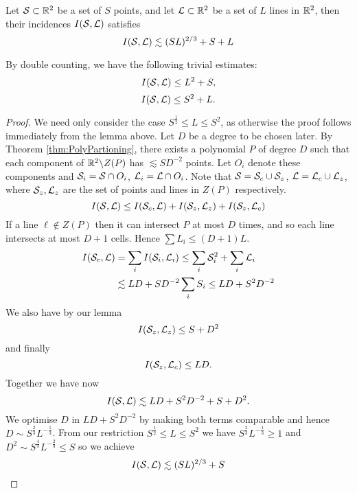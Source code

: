\begin{theorem} 
    Let $\mathcal S \subset \mathbb R^2$ be a set of $S$ points, and let $\mathcal L \subset \mathbb R^2$ be a set of $L$ lines in $\mathbb R^2$, then their incidences $I(\mathcal S,\mathcal L)$ satisfies
    $$
    I(\mathcal S, \mathcal L) \lesssim (SL)^{2/3} + S + L
    $$ 
\end{theorem}
\begin{lemma} 
    By double counting, we have the following trivial estimates:
    $$
    I(\mathcal S, \mathcal L) \leq L^2 + S,
    $$
    $$
    I(\mathcal S, \mathcal L) \leq S^2 + L.
    $$
    
    
\end{lemma}
\begin{proof}
We need only consider the case $S^{\frac{1}{2}} \leq L \leq S^2$, as otherwise the proof follows immediately from the lemma above. Let $D$ be a degree to be chosen later. By Theorem \ref{thm:PolyPartioning}, there
exists a polynomial $P$ of degree $D$ such that each component of $\mathbb R^2 \backslash Z(P)$ has $\lesssim SD^{-2}$ points. Let $O_i$ denote these components and $\mathcal S_i = \mathcal S \cap O_i$, $\mathcal L_i = \mathcal L \cap O_i$. 
Note that $\mathcal S = \mathcal S_c \cup \mathcal S_z$, $\mathcal L = \mathcal L_c \cup \mathcal L_z$, where $\mathcal S_z, \mathcal L_z$ are the set of points and lines in $Z(P)$ respectively.
$$I(\mathcal S, \mathcal L) \leq I(\mathcal S_c, \mathcal L) + I(\mathcal S_z, \mathcal L_z) + I(\mathcal S_z, \mathcal L_c)$$
If a line $\ell \notin Z(P)$ then it can intersect $P$ at most $D$ times, and so each line intersects at most $D+1$ cells. Hence $\sum L_i \leq (D+1)L$.
\begin{align*}
    I(\mathcal S_c, \mathcal L) &= \sum_i I(\mathcal S_i, \mathcal L_i) \leq \sum_i \mathcal S_i^2 + \sum_i \mathcal L_i\\
    &\lesssim LD + SD^{-2} \sum_i S_i \leq LD + S^2D^{-2}
\end{align*} 
We also have by our lemma
$$I(\mathcal S_z, \mathcal L_z) \leq S + D^2$$
and finally $$I(\mathcal S_z, \mathcal L_c) \leq LD.$$
Together we have now 
$$I(\mathcal S, \mathcal L) \lesssim LD + S^2D^{-2} +S + D^2.$$
We optimise $D$ in $LD + S^2D^{-2}$ by making both terms comparable and hence $D \sim S^{\frac{2}{3}} L^{-\frac{1}{3}}$. From our restriction $S^{\frac{1}{2}} \leq L \leq S^2$ we have $S^{\frac{2}{3}} L^{-\frac{1}{3}} \geq 1$
and $D^2 \sim S^{\frac{4}{3}} L^{-\frac{2}{3}} \leq S$ so we achieve
$$I(\mathcal S, \mathcal L) \lesssim (SL)^{2/3} + S $$
\end{proof}